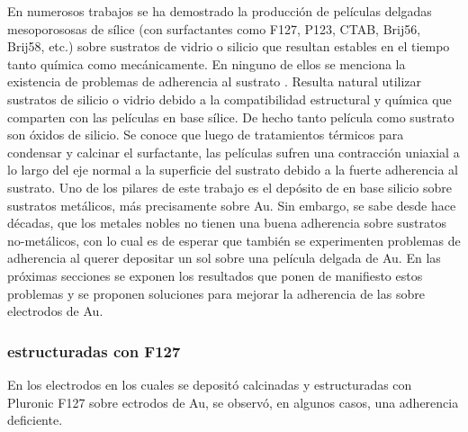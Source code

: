 		 En numerosos trabajos se ha demostrado la producción de películas delgadas mesoporososas de sílice (con surfactantes como F127, P123, CTAB, Brij56, Brij58, etc.) sobre sustratos de vidrio o silicio que resultan estables en el tiempo tanto química como mecánicamente. En ninguno de ellos se menciona la existencia de problemas de adherencia al sustrato \cite{Angelome2008,Fuertes2010,Violi2015}. Resulta natural utilizar sustratos de silicio o vidrio debido a la compatibilidad estructural y química que comparten con las películas en base sílice. De hecho tanto película como sustrato son óxidos de silicio. Se conoce que luego de tratamientos térmicos para condensar y calcinar el surfactante, las películas sufren una contracción uniaxial a lo largo del eje normal a la superficie del sustrato debido a la fuerte adherencia al sustrato.\cite{Grosso2004,Soler-Illia2012,Chougnet2005} Uno de los pilares de este trabajo es el depósito de \pdm\space en base silicio sobre sustratos metálicos, más precisamente sobre Au. Sin embargo, se sabe desde hace décadas, que los metales nobles no tienen una buena adherencia sobre sustratos no-metálicos\cite{Kern1990,Hieber1976}, con lo cual es de esperar que también se experimenten problemas de adherencia al querer depositar un sol sobre una película delgada de Au. \cite{Meyer2004,Nugen2009,nasa1973} En las próximas secciones se exponen los resultados que ponen de manifiesto estos problemas y se proponen soluciones para mejorar la adherencia de las \pdm\space sobre electrodos de Au.

		\subsubsection{\pdm\space estructuradas con F127}

			 En los electrodos en los cuales se depositó \pdm\space calcinadas y estructuradas con Pluronic F127 sobre ectrodos de Au, se observó, en algunos casos, una adherencia deficiente. 
				
